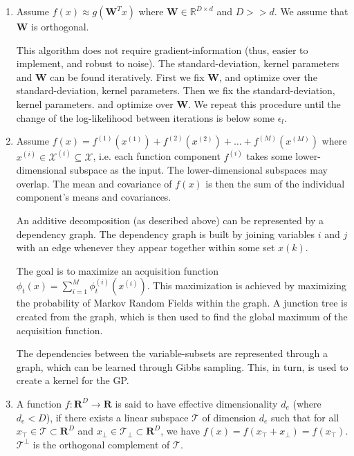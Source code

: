 \documentclass[a4paper,12pt,twoside,openright]{report}
\begin{document}
\begin{enumerate}
\item \cite{Tripathy}
Assume $f(x) \approx g( \mathbf{W}^T x)$ where $ \mathbf{W} \in \mathbb{R}^{D \times d} $ and $D >> d$.
We assume that $ \mathbf{W} $ is orthogonal.

This algorithm does not require gradient-information (thus, easier to implement, and robust to noise).
The standard-deviation, kernel parameters and  $ \mathbf{W} $ can be found iteratively.
First we fix $ \mathbf{W} $, and optimize over the standard-deviation, kernel parameters.
Then we fix the standard-deviation, kernel parameters. and optimize over $ \mathbf{W} $.
We repeat this procedure until the change of the log-likelihood between iterations is below some $ \epsilon_l $.

\item \cite{Rolland}
Assume $f(x) = f^{(1)}( x^{(1)} )  + f^{(2)}( x^{(2)} ) + \ldots + f^{(M)}( x^{(M)} )$ where $ x^{(i)} \in \mathcal{X}^{(i)} \subseteq \mathcal{X}$, i.e. each function component  $f^{(i)}$ takes some lower-dimensional subspace as the input.
The lower-dimensional subspaces may overlap.
The mean and covariance of $f(x)$ is then the sum of the individual component's means and covariances.

An additive decomposition (as described above) can be represented by a dependency graph. The dependency graph is built by joining variables $i$ and $j$ with an edge whenever they appear together within some set $x(k)$. 

The goal is to maximize an acquisition function $ \phi_t(x) = \sum_{i=1}^M \phi_t^{(i)} ( x^{(i)} )$. 
This maximization is achieved by maximizing the probability of Markov Random Fields within the graph.
A junction tree is created from the graph, which is then used to find the global maximum of the acquisition function.

The dependencies between the variable-subsets are represented through a graph, which can be learned through Gibbs sampling.
This, in turn, is used to create a kernel for the GP.

\item \cite{Wang}
A function $f : \mathbf{R}^D \rightarrow \mathbf{R}$ is said to have effective dimensionality $d_e$ (where $d_e < D$), if there exists a linear subspace $\mathcal{T}$ of dimension $d_e$ such that for all $ x_\top \in \mathcal{T} \subset \mathbf{R}^D $ and $x_\perp \in \mathcal{T_\perp} \subset \mathbf{R}^D $, we have $ f(x) = f(x_\top +x_\perp ) = f(x_\top)$.
$\mathcal{T^\perp}$ is the orthogonal complement of $\mathcal{T}$.


\end{enumerate}
\end{document}
